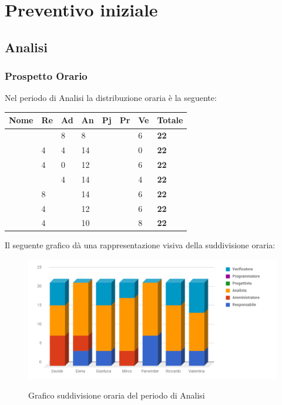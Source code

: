 \documentclass[PianoDiProgetto.tex]{subfiles}
\begin{document}
\chapter{Preventivo iniziale}
\section{Analisi}
\subsection{Prospetto Orario}
Nel periodo di Analisi la distribuzione oraria è la seguente:
\begin{center}

\begin{table}[htbp]
	\centering
	\renewcommand\arraystretch{1.5}
	\begin{tabularx}{\textwidth}{p{4cm}|p{1cm}|p{1cm}|p{1cm}|p{1cm}|p{1cm}|p{1cm}|p{2cm}}
		\hline
		\textbf{Nome} & \textbf{Re} & \textbf{Ad} & \textbf{An} & \textbf{Pj} & \textbf{Pr} & \textbf{Ve} & \textbf{Totale} \\
		\hline
		\Davide & \ & 8 & 8 & \ & \ & 6 & \textbf{22} \\
		\hline
		\Elena & 4 & 4 & 14 & \ & \ & 0 & \textbf{22} \\
		\hline
		\Gianluca & 4 & 0 & 12 & \ & \ & 6 & \textbf{22} \\
		\hline
		\Mirco & \ & 4 & 14 & \ & \ & 4 & \textbf{22} \\
		\hline
		\Parwinder & 8 & \ & 14 & \ & \ & 6 & \textbf{22} \\
		\hline
		\Riccardo & 4 & \ & 12 & \ & \ & 6 & \textbf{22} \\
		\hline
		\Valentina & 4 & \ & 10 & \ & \ & 8 & \textbf{22} \\
		\hline
	\end{tabularx}
\end{table} 
\newpage	
\end{center}
Il seguente grafico dà una rappresentazione visiva della suddivisione oraria:
\begin{figure}[h]
	\includegraphics[width=14.5cm]{images/prospettoOrario/analisi.png}
	\label{fig:foo}
	\caption{Grafico suddivisione oraria del periodo di Analisi}
\end{figure} 
\end{document}

